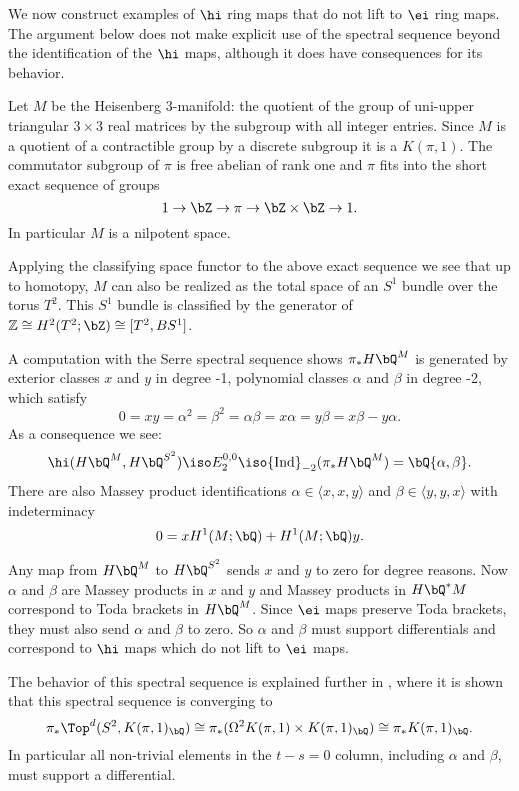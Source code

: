 \documentclass[leqno,oneside,english]{elsarticle}
\begin{document}
\begin{example}
  \label{ex:heisenberg-man}
We now construct examples of $\hi$ ring maps that do not lift to $\ei$
ring maps. The argument below does not make explicit use of the spectral
sequence beyond the identification of the $\hi$ maps, although it does
have consequences for its behavior.

Let $M$ be the Heisenberg 3-manifold: the quotient of the group of
uni-upper triangular $3 \times 3$ real matrices by the subgroup with
all integer entries. Since $M$ is a quotient of a contractible group
by a discrete subgroup it is a $K(\pi, 1).$ The commutator subgroup
of $\pi$ is free abelian of rank one and $\pi$ fits into the short
exact sequence of groups 
\[ 
  1 \to \bZ \to \pi \to \bZ \times \bZ \to 1.  
\]
In particular $M$ is a nilpotent space.

Applying the classifying space functor to the above exact sequence
we see that up to homotopy, $M$ can also be realized as the total
space of an $S^1$ bundle over the torus $T^2$. This $S^1$ bundle is
classified by the generator of $\mathbb{Z}\cong H^2(T^2; \bZ) \cong
[T^2, BS^1]$.

A computation with the Serre spectral sequence shows $\pi_*H\bQ^M$ is
generated by exterior classes $x$ and $y$ in degree -1, polynomial
classes $\alpha$ and $\beta$ in degree -2, which satisfy
\[
0=xy=\alpha^2 = \beta^2 = \alpha\beta = x\alpha = y\beta =x\beta - y \alpha. \] 
{{\ifshowsaveblocks
{}
\fi}}{}As a consequence we see:
\begin{equation}\label{eq:ind}
  \hi (H\bQ^M , H\bQ^{S^2})  \iso E_2^{0,0} \iso {\mathrm{Ind}}_{-2}(\pi_*H\bQ^M) = \bQ\{
  \alpha, \beta \}.
\end{equation}
There are also Massey product identifications $\alpha \in \langle x, x, y\rangle$
and $\beta \in \langle y, y, x\rangle$ with indeterminacy \[0=x H^1(M;\bQ)+H^1(M;\bQ)y.\]

Any map from $H\bQ^M$ to $H\bQ^{S^2}$ sends $x$ and $y$ to zero
for degree reasons.  Now $\alpha$ and $\beta$ are Massey products in
$x$ and $y$ and Massey products in $H\bQ^* M$ correspond to Toda
brackets in $H\bQ^M$.  Since $\ei$ maps preserve Toda brackets, they
must also send $\alpha$ and $\beta$ to zero. So $\alpha$ and
$\beta$ must support differentials and correspond to $\hi$ maps which do
not lift to $\ei$ maps. 

The behavior of this spectral sequence is explained further in
\cite{Noe14}, where it is shown that this spectral sequence is
converging to 
\[
\pi_* \Top^d(S^2, K(\pi,1)_\bQ) \cong 
\pi_* (\Omega^2 K(\pi,1)\times K(\pi,1)_\bQ)
\cong \pi_* K(\pi,1)_\bQ.
\]
In particular all non-trivial elements in the $t-s=0$ column, including $\alpha$ and $\beta$, must support a differential.

\end{example}
\end{document}
